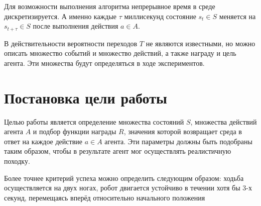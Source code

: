 Для возможности выполнения алгоритма непрерывное время в среде дискретизируется. А именно каждые $\tau$ миллисекунд состояние $s_t \in S$ меняется на $s_{t+\tau} \in S$ после выполнения действия $a \in A$.

В действительности вероятности переходов $T$ не являются известными, но можно описать множество событий и множество действий, а также награду и цель агента. Эти множества будут определяться в ходе экспериментов.

\section{Постановка цели работы}\label{sec:ch1/sec4}
Целью работы является определение множества состояний $S$, множества действий агента $A$ и подбор функции награды $R$, значения которой возвращает среда в ответ на каждое действие $a \in A$ агента. Эти параметры должны быть подобраны таким образом, чтобы в результате агент мог осуществлять реалистичную походку.

Более точнее критерий успеха можно определить следующим образом: ходьба осуществляется на двух ногах, робот двигается устойчиво в течении хотя бы 3-х секунд, перемещаясь вперёд относительно начального положения
